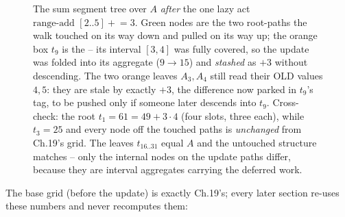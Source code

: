 \begin{figure}[H]
\caption{The sum segment tree over \(A\) \emph{after} the one lazy act
\(\text{range-add }[2..5]\mathrel{+}= 3\).  Green nodes are the two root-paths the
walk touched on its way down and pulled on its way up; the orange box \(t_9\) is
the  -- its interval \([3,4]\) was fully covered, so the update
was folded into its aggregate (\(9\to15\)) and \emph{stashed} as \(+3\) without
descending.  The two orange leaves \(A_3,A_4\) still read their OLD values \(4,5\):
they are stale by exactly \(+3\), the difference now parked in \(t_9\)'s tag, to be
pushed only if someone later descends into \(t_9\).  Cross-check: the root
\(t_1=61 = 49 + 3\cdot 4\) (four slots, three each), while \(t_3=25\) and every
node off the touched paths is \emph{unchanged} from Ch.19's grid.  The leaves
\(t_{16..31}\) equal \(A\) and the untouched structure matches
 -- only the internal nodes on the update paths differ, because
they are interval aggregates carrying the deferred work.}
\label{fig:c15-tree}
\end{figure}

The base grid (before the update) is exactly Ch.19's; every later section re-uses
these numbers and never recomputes them:

